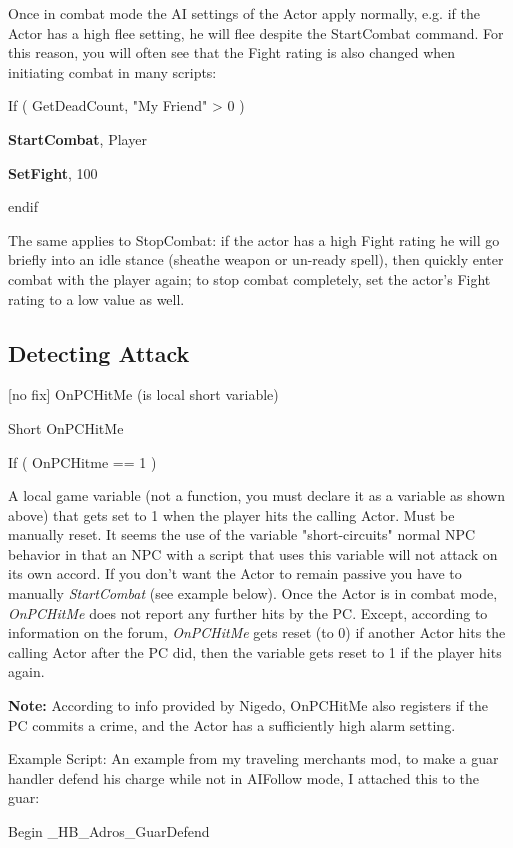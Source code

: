 \documentclass[
]{article}
\begin{document}
Once in combat mode the AI settings of the Actor apply normally, e.g. if
the Actor has a high flee setting, he will flee despite the StartCombat
command. For this reason, you will often see that the Fight rating is
also changed when initiating combat in many scripts:

If ( GetDeadCount, "My Friend" \textgreater{} 0 )

\textbf{StartCombat}, Player

\textbf{SetFight}, 100

endif

The same applies to StopCombat: if the actor has a high Fight rating he
will go briefly into an idle stance (sheathe weapon or un-ready spell),
then quickly enter combat with the player again; to stop combat
completely, set the actor's Fight rating to a low value as well.

\hypertarget{detecting-attack}{%
\subsection{Detecting Attack}\label{detecting-attack}}

{[}no fix{]} OnPCHitMe (is local short variable)

Short OnPCHitMe

If ( OnPCHitme == 1 )

A local game variable (not a function, you must declare it as a variable
as shown above) that gets set to 1 when the player hits the calling
Actor. Must be manually reset. It seems the use of the variable
"short-circuits" normal NPC behavior in that an NPC with a script that
uses this variable will not attack on its own accord. If you don't want
the Actor to remain passive you have to manually \emph{StartCombat} (see
example below). Once the Actor is in combat mode, \emph{OnPCHitMe} does
not report any further hits by the PC. Except, according to information
on the forum, \emph{OnPCHitMe} gets reset (to 0) if another Actor hits
the calling Actor after the PC did, then the variable gets reset to 1 if
the player hits again.

\textbf{Note:} According to info provided by Nigedo, OnPCHitMe also
registers if the PC commits a crime, and the Actor has a sufficiently
high alarm setting.

Example Script: An example from my traveling merchants mod, to make a
guar handler defend his charge while not in AIFollow mode, I attached
this to the guar:

Begin \_HB\_Adros\_GuarDefend
\end{document}
